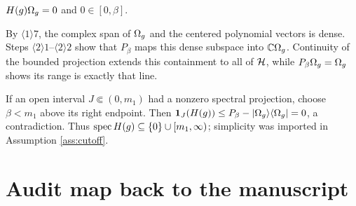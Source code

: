 \documentclass[11pt,a4paper]{article}
\begin{document}

\Because $H(g)\Omega_g=0$ and $0\in[0,\beta]$.


\Because By $\langle1\rangle7$, the complex span of $\Omega_g$ and the centered
polynomial vectors is dense.  Steps $\langle2\rangle1$--$\langle2\rangle2$ show that
$P_\beta$ maps this dense subspace into $\mathbb C\Omega_g$.  Continuity of the bounded
projection extends this containment to all of $\mathcal H$, while
$P_\beta\Omega_g=\Omega_g$ shows its range is exactly that line.


\Because If an open interval $J\Subset(0,m_1)$ had a nonzero spectral projection,
choose $\beta<m_1$ above its right endpoint.  Then
$\mathbf1_J(H(g))\leq P_\beta-|\Omega_g\rangle\langle\Omega_g|=0$, a contradiction.
Thus $\operatorname{spec} H(g)\subseteq\{0\}\cup[m_1,\infty)$; simplicity was imported in
Assumption \ref{ass:cutoff}.

\QedStep

\section{Audit map back to the manuscript}
\end{document}
